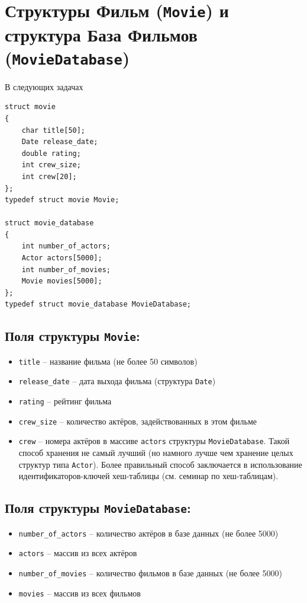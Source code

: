 \documentclass{article}
\begin{document}
\section*{Структуры Фильм (\texttt{Movie}) и структура База Фильмов (\texttt{MovieDatabase})}
В следующих задачах 
\begin{lstlisting}
struct movie 
{
	char title[50];
	Date release_date;
	double rating;
	int crew_size;
	int crew[20];
};
typedef struct movie Movie;

struct movie_database 
{
	int number_of_actors;
	Actor actors[5000];
	int number_of_movies;
	Movie movies[5000]; 
};
typedef struct movie_database MovieDatabase;
\end{lstlisting}

\subsection*{Поля структуры \texttt{Movie}:}
\begin{itemize}
\item \texttt{title} -- название фильма (не более 50 символов)
\item \texttt{release\_date} -- дата выхода фильма (структура \texttt{Date})
\item \texttt{rating} -- рейтинг фильма
\item \texttt{crew\_size} -- количество актёров, задействованных в этом фильме
\item \texttt{crew} -- номера актёров в массиве \texttt{actors} структуры \texttt{MovieDatabase}. Такой способ хранения не самый лучший (но намного лучше чем хранение целых структур типа \texttt{Actor}). Более правильный способ заключается в использование идентификаторов-ключей хеш-таблицы (см. семинар по хеш-таблицам).
\end{itemize}
\subsection*{Поля структуры \texttt{MovieDatabase}:}
\begin{itemize}
\item \texttt{number\_of\_actors} -- количество актёров в базе данных (не более 5000)
\item \texttt{actors} -- массив из всех актёров
\item \texttt{number\_of\_movies} -- количество фильмов в базе данных (не более 5000)
\item \texttt{movies} -- массив из всех фильмов
\end{itemize}
\end{document}
